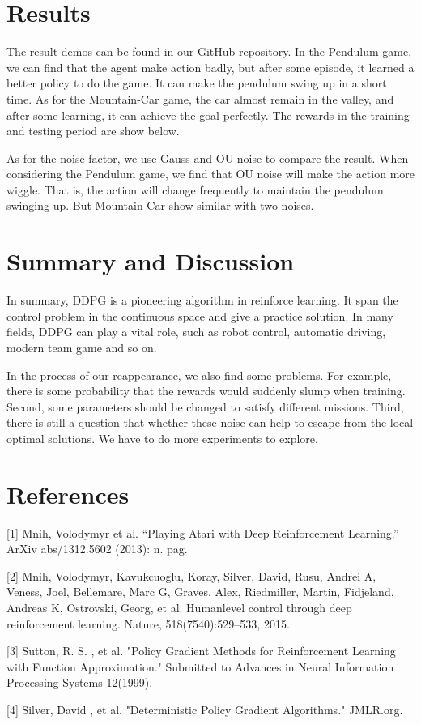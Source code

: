 \documentclass[a4paper,12pt,oneside,article]{memoir}
\begin{document}
\chapter{Results}
The result demos can be found in our GitHub repository. In the Pendulum game, we can find that the agent make action badly, but after some episode, it learned a better policy to do the game. It can make the pendulum swing up in a short time. As for the Mountain-Car game, the car almost remain in the valley, and after some learning, it can achieve the goal perfectly. The rewards in the training and testing period are show below.


As for the noise factor, we use Gauss and OU noise to compare the result. When considering the Pendulum game, we find that OU noise will make the action more wiggle. That is, the action will change frequently to maintain the pendulum swinging up. But Mountain-Car show similar with two noises.



\chapter{Summary and Discussion}
In summary, DDPG is a pioneering algorithm in reinforce learning. It span the control problem in the continuous space and give a practice solution. In many fields, DDPG can play a vital role, such as robot control, automatic driving, modern team game and so on.


In the process of our reappearance, we also find some problems. For example, there is some probability that the rewards would suddenly slump when training. Second, some parameters should be changed to satisfy different missions. Third, there is still a question that whether these noise can help to escape from the local optimal solutions. We have to do more experiments to explore.


\chapter*{References}

[1] Mnih, Volodymyr et al. “Playing Atari with Deep Reinforcement Learning.” ArXiv abs/1312.5602 (2013): n. pag.

[2] Mnih, Volodymyr, Kavukcuoglu, Koray, Silver, David, Rusu, Andrei A, Veness, Joel, Bellemare, Marc G, Graves, Alex, Riedmiller, Martin, Fidjeland, Andreas K, Ostrovski, Georg, et al. Humanlevel control through deep reinforcement learning. Nature, 518(7540):529–533, 2015.

[3] Sutton, R. S. , et al. "Policy Gradient Methods for Reinforcement Learning with Function Approximation." Submitted to Advances in Neural Information Processing Systems 12(1999).

[4] Silver, David , et al. "Deterministic Policy Gradient Algorithms." JMLR.org.



\end{document}
